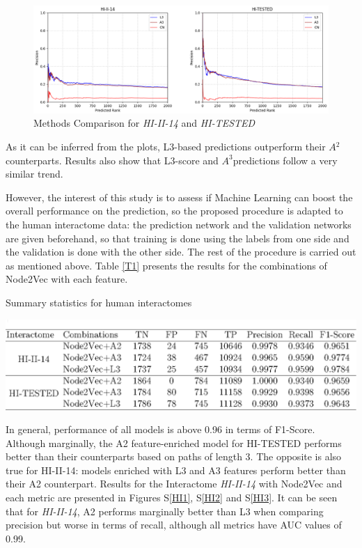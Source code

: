 \begin{figure}[h]
\caption{\label{fig:HI1}Methods Comparison for \emph{HI-II-14} and \emph{HI-TESTED}}
	\includegraphics[width=\textwidth ]{figures/figure2.eps}
\end{figure}

As it can be inferred from the plots, L3-based predictions outperform
their $A{{}^2}$ counterparts. Results also show that L3-score and
$A^{3}$predictions follow a very similar trend.

However, the interest of this study is to assess if Machine Learning can boost
the overall performance on the prediction, so the proposed procedure 
is adapted to the human interactome data: the prediction network and 
the validation networks are given beforehand, so that training is done using 
the labels from one side and the validation is done with the other side. 
The rest of the procedure is carried out as mentioned above.
Table \ref{T1} presents the results for the combinations of Node2Vec
with each feature.

\begin{table}
\caption{\label{T1}Summary statistics for human interactomes}
\includegraphics[width=1\columnwidth]{figures/T1}
\end{table}

In general, performance of all models is above 0.96 in terms of F1-Score.
Although marginally, the A2 feature-enriched model for HI-TESTED performs
better than their counterparts based on paths of length 3. The opposite
is also true for HI-II-14: models enriched with L3 and A3 features
perform better than their A2 counterpart. Results for the Interactome
\emph{HI-II-14} with Node2Vec and each metric are presented in Figures
S\ref{HI1}, S\ref{HI2} and S\ref{HI3}. It can be seen that for
\emph{HI-II-14}, A2 performs marginally better than L3 when comparing
precision but worse in terms of recall, although all metrics have
AUC values of 0.99.

